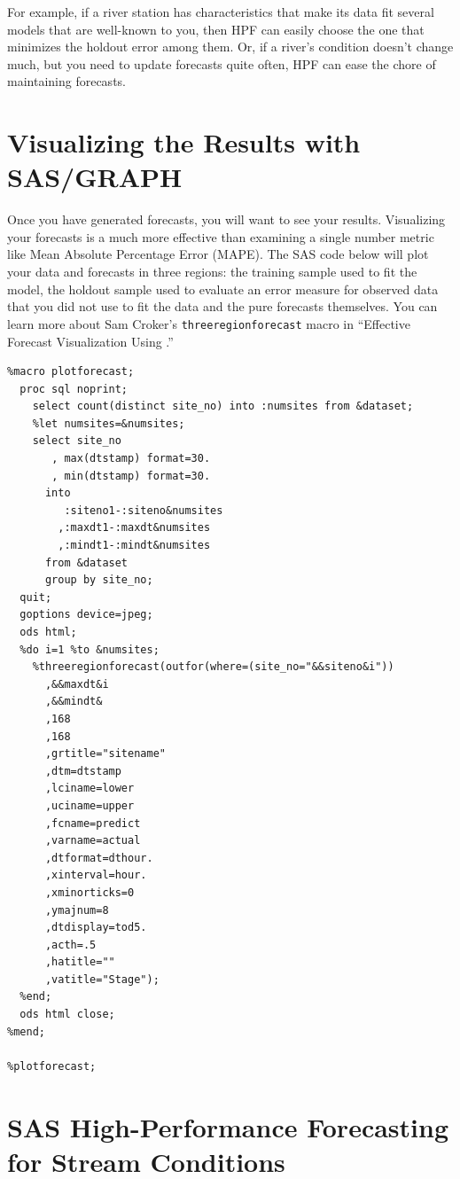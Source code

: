 \documentclass[10pt]{sugconf-ish}
\begin{document}
For example, if a river station has characteristics that make its data fit several models that are well-known to you, then HPF can easily choose the one that minimizes the holdout error among them. Or, if a river's condition doesn't change much, but you need to update forecasts quite often, HPF can ease the chore of maintaining forecasts.


\section{Visualizing the Results with SAS/GRAPH}

Once you have generated forecasts, you will want to see your results. Visualizing your forecasts is a much more effective than examining a single number metric like Mean Absolute Percentage Error (MAPE). The SAS code below will plot your data and forecasts in three regions: the training sample used to fit the model, the holdout sample used to evaluate an error measure for observed data that you did not use to fit the data and the pure forecasts themselves. 
You can learn more about Sam Croker's \texttt{threeregionforecast} macro in ``Effective Forecast Visualization Using \SASregistered.''

\small
\begin{verbatim}
%macro plotforecast;
  proc sql noprint;
    select count(distinct site_no) into :numsites from &dataset;
    %let numsites=&numsites;
    select site_no
       , max(dtstamp) format=30.
       , min(dtstamp) format=30.
      into 
         :siteno1-:siteno&numsites 
        ,:maxdt1-:maxdt&numsites
        ,:mindt1-:mindt&numsites
      from &dataset 
      group by site_no;
  quit; 
  goptions device=jpeg;
  ods html;
  %do i=1 %to &numsites;    
    %threeregionforecast(outfor(where=(site_no="&&siteno&i"))
      ,&&maxdt&i
      ,&&mindt&
      ,168
      ,168
      ,grtitle="sitename"
      ,dtm=dtstamp    
      ,lciname=lower
      ,uciname=upper
      ,fcname=predict
      ,varname=actual
      ,dtformat=dthour.
      ,xinterval=hour.
      ,xminorticks=0
      ,ymajnum=8
      ,dtdisplay=tod5.
      ,acth=.5
      ,hatitle=""
      ,vatitle="Stage");
  %end;    
  ods html close;
%mend;

%plotforecast;
\end{verbatim}
\normalsize



\section{SAS High-Performance Forecasting for Stream Conditions}
\end{document}

